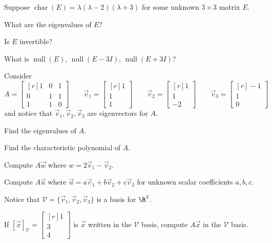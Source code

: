 \documentclass{problemset}
\DeclareMathOperator{\Null}{null}
\DeclareMathOperator{\chr}{char}
\newcommand{\mat}[1]{\begin{bmatrix*}[r]#1\end{bmatrix*}}
\begin{document}
	\vspace{-.3cm}
	\question
	\vspace{-.2cm}
	Suppose $\chr(E)=\lambda(\lambda -2)(\lambda +3)$ for some unknown $3\times 3$
	matrix $E$.
	\begin{parts}
		\item What are the eigenvalues of $E$?
		\item Is $E$ invertible?
		\item What is $\Null(E)$, $\Null(E-3I)$, $\Null(E+3I)$?
	\end{parts}

	\question
	Consider
	\[
		A=\mat{1&0&1\\0&1&1\\1&1&0}\qquad
		\vec v_1=\mat{1\\1\\1}\qquad
		\vec v_2=\mat{1\\1\\-2}\qquad
		\vec v_3=\mat{-1\\1\\0}
	\]
	and notice that $\vec v_1,\vec v_2,\vec v_3$ are eigenvectors for $A$.
	\begin{parts}
		\item Find the eigenvalues of $A$.
		\item Find the characteristic polynomial of $A$.
		\item Compute $A\vec w$ where $w=2\vec v_1-\vec v_2$.
		\item Compute $A\vec u$ where $\vec u=a\vec v_1+b\vec v_2+c\vec v_3$ for
			unknown scalar coefficients $a,b,c$.
	\end{parts}
	Notice that $\mathcal V=\{\vec v_1,\vec v_2,\vec v_3\}$ is a basis for $\R^3$.
	\begin{parts}[resume]
	\item If $[\vec x]_{\mathcal V}=\mat{1\\3\\4}$ is $\vec x$ written in the $\mathcal V$ basis,
		compute $A\vec x$ in the $\mathcal V$ basis.
	\end{parts}
	
\end{document}
